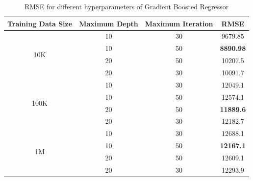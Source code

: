 \documentclass[10pt,twocolumn,letterpaper]{article}
\begin{document}
\begin{table}[t!]
\small
\begin{center}
\begin{tabular}{|c|c|c|c|}
\hline  \textbf{Training Data Size} & \textbf{Maximum Depth} & \textbf{Maximum Iteration} & \textbf{RMSE}  \\ \hline
\multirow{4}{*}{10K}  & 10 & 30 & 9679.85  \\ 
  & 10 & 50 & \textbf{8890.98}  \\
  & 20 & 50 & 10207.5  \\
  & 20 & 30 & 10091.7  \\ \hline
\multirow{4}{*}{100K}  & 10 & 30 & 12049.1  \\ 
  & 10 & 50 & 12574.1  \\
  & 20 & 50 & \textbf{11889.6}  \\
  & 20 & 30 & 12182.7  \\ \hline
\multirow{4}{*}{1M}  & 10 & 30 & 12688.1 \\
  & 10 & 50 & \textbf{12167.1}  \\
  & 20 & 50 & 12609.1  \\
  & 20 & 30 & 12293.9  \\ \hline
\end{tabular}
\end{center}
\caption{RMSE for different hyperparameters of Gradient Boosted Regressor}
\label{pairwise-summary-table}
\end{table}

\end{document}
